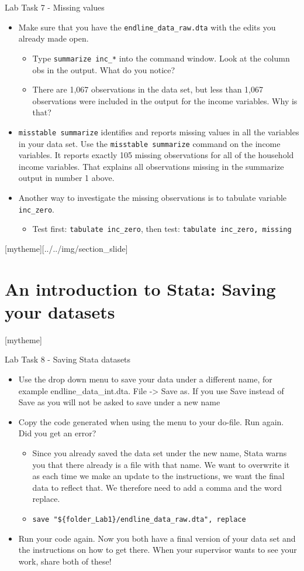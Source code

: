 \documentclass[aspectratio=169]{beamer}
\newcommand{\sectionpic}[2]{
	\setbeamertemplate{section page}[mytheme][#2]
	\section{#1}
	\setbeamertemplate{section page}[mytheme]
}
\begin{document}
\begin{frame}{Lab Task 7 - Missing values}
	\begin{itemize}
		\item Make sure that you have the \texttt{endline\_data\_raw.dta} with the edits you already made open.
		\begin{itemize}
			\item Type \texttt{summarize inc\_*} into the command window. Look at the column obs in the output. What do you notice?
			\item There are  1,067 observations in the data set, but less than 1,067 observations were included in the output for the income variables. Why is that?
		\end{itemize}
		\item \texttt{misstable summarize} identifies and reports missing values in all the variables in your data set. Use the \texttt{misstable summarize} command on the income variables. It reports exactly 105 missing observations for all of the household income variables. That explains all observations missing in the summarize output in number 1 above.
		\item Another way to investigate the missing observations is to tabulate variable \texttt{inc\_zero}.
		\begin{itemize}
			\item Test first: \texttt{tabulate inc\_zero}, then test: \texttt{tabulate inc\_zero, missing}
		\end{itemize}
	\end{itemize}
\end{frame}

\sectionpic{An introduction to Stata: \newline Saving your datasets}{../../img/section_slide}

\begin{frame}{Lab Task 8 - Saving Stata datasets}
	\begin{itemize}
		\item Use the drop down menu to save your data under a different name, for example endline\_data\_int.dta. File -> Save as. If you use Save instead of Save as you will not be asked to save under a new name
		\item Copy the code generated when using the menu to your do-file. Run again. Did you get an error?
			\begin{itemize}
				\item Since you already saved the data set under the new name, Stata warns you that there already is a file with that name. We want to overwrite it as each time we make an update to the instructions, we want the final data to reflect that. We therefore need to add a comma and the word replace.
				\item \texttt{save "\$\{folder\_Lab1\}/endline\_data\_raw.dta", replace}
			\end{itemize}
		\item Run your code again. Now you both have a final version of your data set and the instructions on how to get there. When your supervisor wants to see your work, share both of these!
	\end{itemize}
\end{frame}
\end{document}

